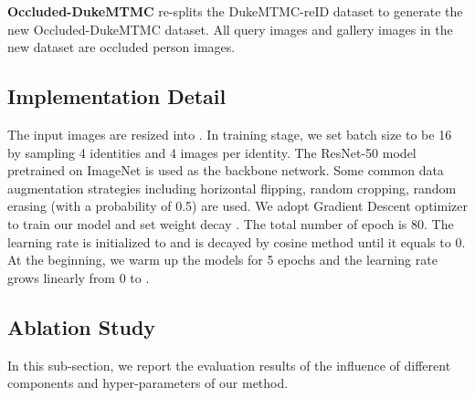 \documentclass[final]{cvpr}
\begin{document}
\noindent \textbf{Occluded-DukeMTMC} re-splits the DukeMTMC-reID dataset to generate the new Occluded-DukeMTMC dataset. All query images and  gallery images in the new dataset are occluded person images.

\subsection{Implementation Detail}
The input images are resized into . In training stage, we set batch size to be 16 by sampling 4 identities and 4 images per identity. The ResNet-50 \cite{he2016deep} model pretrained on ImageNet is used as the backbone network. Some common data augmentation strategies including horizontal flipping, random cropping,  random erasing \cite{zhong2017random} (with a probability of 0.5) are used. We adopt Gradient Descent optimizer to train our model and set weight decay . The total number of epoch is 80. The learning rate is initialized to  and is decayed by cosine method until it equals to 0. At the beginning, we warm up the models for 5 epochs and the learning rate grows linearly from 0 to .

\subsection{Ablation Study}

In this sub-section, we report the evaluation results of the influence of different components and hyper-parameters of our method. 
\end{document}
